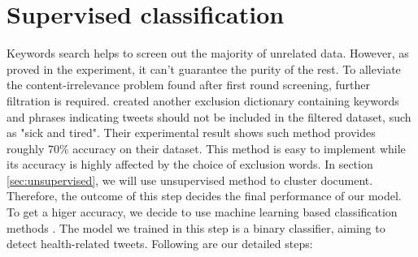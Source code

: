 \section{Supervised classification}
\label{sec:Supervised classification}
Keywords search helps to screen out the majority of unrelated data. However, as proved in the experiment, it can't guarantee the purity of the rest. To alleviate the content-irrelevance problem found after first round screening, further filtration is required. \cite{elkin2017network} created another exclusion dictionary containing keywords and phrases indicating tweets should not be included in the filtered dataset, such as "sick and tired". Their experimental result shows such method provides roughly 70\% accuracy on their dataset. This method is easy to implement while its accuracy is highly affected by the choice of exclusion words. In section \ref{sec:unsupervised}, we will use unsupervised method to cluster document. Therefore, the outcome of this step decides the final performance of our model. To get a higer accuracy, we decide to use machine learning based classification methods \cite{aramaki2011twitter}. The model we trained in this step is a binary classifier, aiming to detect health-related tweets. Following are our detailed steps:
